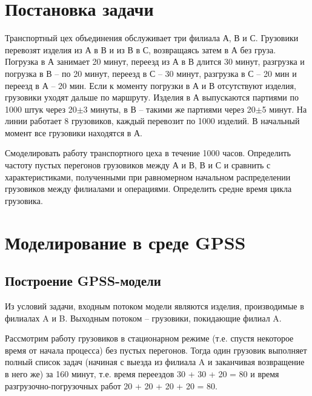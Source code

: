 \documentclass[a4paper, 12pt]{article}        %
\begin{document}
\tableofcontents


\newpage
\section*{Постановка задачи}

Транспортный цех объединения обслуживает три филиала А, В и С. Грузовики перевозят изделия из А в В и из В в С, возвращаясь затем в А без груза. Погрузка в А занимает 20 минут, переезд из А в В длится 30 минут, разгрузка и погрузка в В -- по 20 минут, переезд в С -- 30 минут, разгрузка в С -- 20 мин и переезд в А -- 20 мин. Если к моменту погрузки в А и В отсутствуют изделия, грузовики уходят дальше по маршруту. Изделия в А выпускаются партиями по 1000 штук через 20$\pm$3 минуты, в В -- такими же партиями через 20$\pm$5 минут. На линии работает 8 грузовиков, каждый перевозит по 1000 изделий. В начальный момент все грузовики находятся в А.

Смоделировать работу транспортного цеха в течение 1000 часов. Определить частоту пустых перегонов грузовиков между А и В, В и С и сравнить с характеристиками, полученными при равномерном начальном распределении грузовиков между филиалами и операциями. Определить средне время цикла грузовика.

\newpage
\section{Моделирование в среде GPSS}

\subsection{Построение GPSS-модели}

Из условий задачи, входным потоком модели являются изделия, производимые в филиалах A и B. Выходным потоком -- грузовики, покидающие филиал A.

Рассмотрим работу грузовиков в стационарном режиме (т.е. спустя некоторое время от начала процесса) без пустых перегонов. Тогда один грузовик выполняет полный список задач (начиная с выезда из филиала A и заканчивая возвращение в него же) за 160 минут, т.е. время переездов 30 + 30 + 20 = 80 и время разгрузочно-погрузочных работ 20 + 20 + 20 + 20 = 80.
\end{document}
